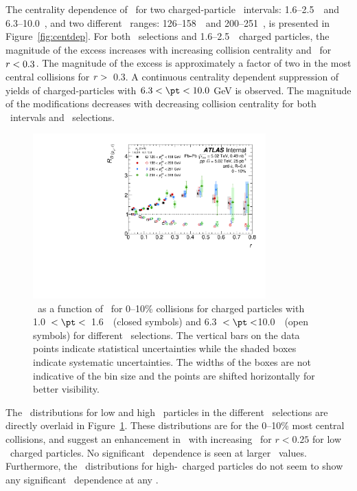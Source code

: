 The centrality dependence of \RDptr\ for two charged-particle \pt\ intervals: 1.6--2.5~\GeV\ and \mbox{6.3--10.0~\GeV}, and two different \ptjet\ ranges: 126--158~\GeV\ and 200--251~\GeV, is presented in Figure~\ref{fig:centdep}. 
For both \ptjet\ selections and  1.6--2.5~\GeV\ charged particles, the magnitude of the excess increases
with increasing collision centrality and \rvar\ for $\mbox{$r$} < 0.3$.  The magnitude of the excess is
approximately a factor of two in the most central collisions for $\mbox{$r$} >$~0.3.
A continuous centrality dependent suppression of  yields of charged-particles with $6.3 < \pt < 10.0$ GeV is observed.
The magnitude of the modifications decreases with decreasing collision centrality for both \pt\ 
intervals and \ptjet\ selections.

\begin{figure}[ht]
\centerline{
\includegraphics[width=0.8\textwidth]{figures/results/RDpT_dR_trk3_trk6_cent0.pdf} 
}
\caption{\RDptr\ as a function of \rvar\ for 0--10\% collisions for charged particles with 1.0~$< \pt <$~1.6~\GeV\
(closed symbols) and 6.3~$< \pt <$10.0~\GeV\ (open symbols) for different \ptjet\ selections. The vertical bars on the data points indicate statistical uncertainties while the shaded boxes indicate systematic uncertainties. The widths of the boxes are not indicative of the bin size and the points are shifted horizontally for better visibility.}
\label{fig:ptjetdep}
\end{figure}


The \RDptr\ distributions for low and high \pt\ particles in the different \ptjet\ selections are directly overlaid in Figure~\ref{fig:ptjetdep}. These distributions are for the 0--10\% 
most central collisions, and suggest an enhancement in \RDptr\ with increasing \ptjet\  for $r < 0.25$ for low 
\pt\ charged particles. No significant \ptjet\ dependence is seen at larger \rvar\ values. Furthermore, the \RDptr\ distributions for high-\pt\ charged particles do not seem to show any significant \ptjet\ dependence at any \rvar.


